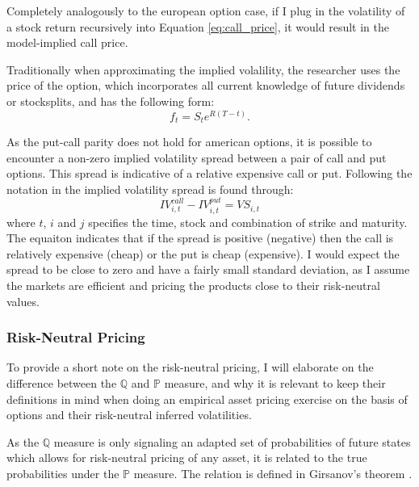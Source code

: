 Completely analogously to the european option case, if I plug in the volatility of a stock return recursively into Equation \ref{eq:call_price}, it would result in the model-implied call price.

Traditionally when approximating the implied volalility, the researcher uses the price of the option, which incorporates all current knowledge of future dividends or stocksplits, and has the following form:
\begin{equation}
	f_{t}=S_{t}e^{R\left(T-t\right)}.
	\label{eq:forwardprice}
\end{equation}

As the put-call parity does not hold for american options, it is possible to encounter a non-zero implied volatility spread between a pair of call and put options. This spread is indicative of a relative expensive call or put. Following the notation in \cite{cremers2010deviations} the implied volatility spread is found through:
\begin{equation}
	IV_{i,t}^{call}-IV_{i,t}^{put}=VS_{i,t} 
	\label{eq:imp_vol_spread_CW}
\end{equation}
where $t$, $i$ and $j$ specifies the time, stock and combination of strike and maturity. The equaiton indicates that if the spread is positive (negative) then the call is relatively expensive (cheap) or the put is cheap (expensive). I would expect the spread to be close to zero and have a fairly small standard deviation, as I assume the markets are efficient and pricing the products close to their risk-neutral values.

\subsubsection{Risk-Neutral Pricing}

To provide a short note on the risk-neutral pricing, I will elaborate on the difference between the $\mathbb{Q}$ and $\mathbb{P}$ measure, and why it is relevant to keep their definitions in mind when doing an empirical asset pricing exercise on the basis of options and their risk-neutral inferred volatilities.


As the $\mathbb{Q}$ measure is only signaling an adapted set of probabilities of future states which allows for risk-neutral pricing of any asset, it is related to the true probabilities under the $\mathbb{P}$ measure. The relation is defined in Girsanov's theorem \citep{girsanov1960transforming}. 

